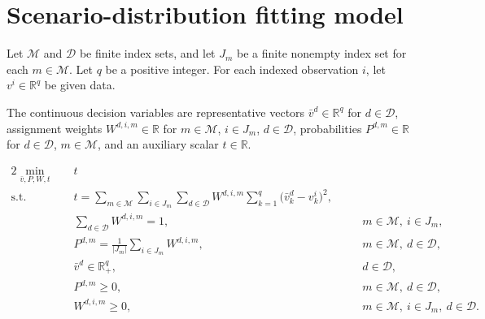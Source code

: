 \documentclass{article}
\begin{document}
\section*{Scenario-distribution fitting model}

Let $\mathcal M$ and $\mathcal D$ be finite index sets, and let $J_m$ be a finite nonempty index set for each $m\in\mathcal M$. Let $q$ be a positive integer. For each indexed observation $i$, let $v^i\in\mathbb R^q$ be given data.

The continuous decision variables are representative vectors $\bar v^d\in\mathbb R^q$ for $d\in\mathcal D$, assignment weights $W^{d,i,m}\in\mathbb R$ for $m\in\mathcal M$, $i\in J_m$, $d\in\mathcal D$, probabilities $P^{d,m}\in\mathbb R$ for $d\in\mathcal D$, $m\in\mathcal M$, and an auxiliary scalar $t\in\mathbb R$.

\begin{alignat}{2}
\min_{\bar v,P,W,t}\quad & t \\
\text{s.t.}\quad
&t=\sum_{m\in\mathcal M}\sum_{i\in J_m}\sum_{d\in\mathcal D}W^{d,i,m}\sum_{k=1}^{q}\bigl(\bar v_k^d-v_k^i\bigr)^2, & &\\
&\sum_{d\in\mathcal D}W^{d,i,m}=1, & &\quad m\in\mathcal M,\ i\in J_m,\\
&P^{d,m}=\frac{1}{|J_m|}\sum_{i\in J_m}W^{d,i,m}, & &\quad m\in\mathcal M,\ d\in\mathcal D,\\
&\bar v^d\in\mathbb R_+^q, & &\quad d\in\mathcal D,\\
&P^{d,m}\ge 0, & &\quad m\in\mathcal M,\ d\in\mathcal D,\\
&W^{d,i,m}\ge 0, & &\quad m\in\mathcal M,\ i\in J_m,\ d\in\mathcal D.
\end{alignat}
\end{document}
